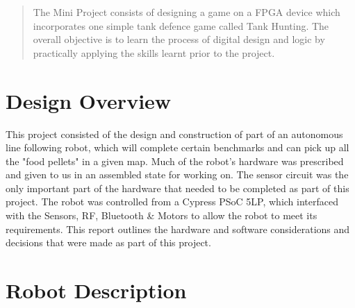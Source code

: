 \documentclass{article}
\begin{document}
\newpage

\maketitle


\begin{abstract}

The Mini Project consists of designing a game on a FPGA device which incorporates one simple tank defence game called Tank Hunting. The overall objective is to learn the process of digital design and logic by practically applying the skills learnt prior to the project.

\end{abstract}


\section{Design Overview}

This project consisted of the design and construction of part of an autonomous line following robot, which will complete certain benchmarks and can pick up all the "food pellets" in a given map. Much of the robot's hardware was prescribed and given to us in an assembled state for working on. The sensor circuit was the only important part of the hardware that needed to be completed as part of this project. The robot was controlled from a Cypress PSoC 5LP, which interfaced with the Sensors, RF, Bluetooth \&  Motors to allow the robot to meet its requirements. This report outlines the hardware and software considerations and decisions that were made as part of this project.

\section{Robot Description}

\end{document}

